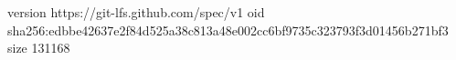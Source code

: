 version https://git-lfs.github.com/spec/v1
oid sha256:edbbe42637e2f84d525a38c813a48e002cc6bf9735c323793f3d01456b271bf3
size 131168
